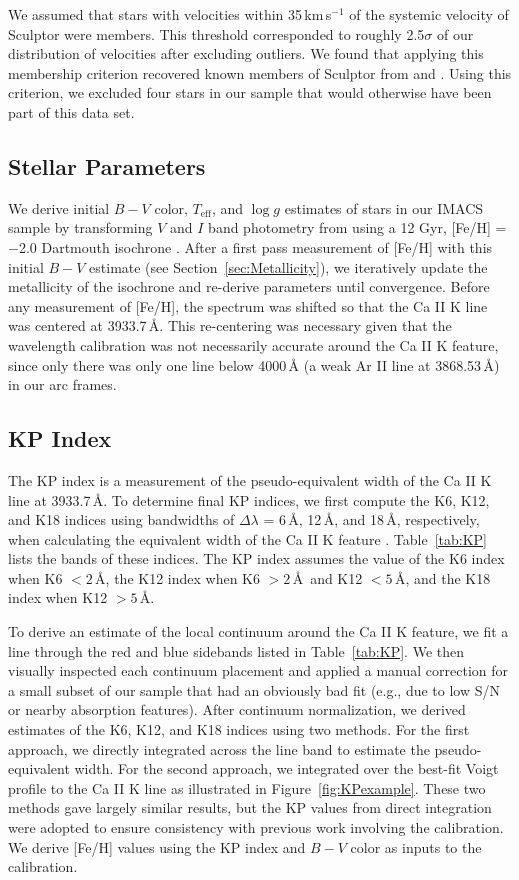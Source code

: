 \documentclass{emulateapj-rtx4}
\begin{document}
We assumed that stars with velocities within 35\,km\,s$^{-1}$ of the systemic velocity of Sculptor were members.
This threshold corresponded to roughly 2.5$\sigma$ of our distribution of velocities after excluding outliers.
We found that applying this membership criterion recovered known members of Sculptor from \citet{wmo+09} and \citet{kgb+09}.
Using this criterion, we excluded four stars in our sample that would otherwise have been part of this data set.

\subsection{Stellar Parameters}
\label{sec:atm}
We derive initial $B-V$ color, $T_{\text{eff}}$, and $\log g$ estimates of stars in our IMACS sample by 
transforming $V$ and $I$ band photometry from \citet{cdb+05} using a 12 Gyr, [Fe/H] = $-$2.0 
Dartmouth isochrone \citep{dcj+08}. 
After a first pass measurement of [Fe/H] with this initial $B-V$ 
estimate (see Section~\ref{sec:Metallicity}), we iteratively update the metallicity 
of the isochrone and re-derive parameters until convergence. 
Before any measurement of [Fe/H], the spectrum was shifted so that the Ca II K line was centered at 3933.7\,\AA.
This re-centering was necessary given that the wavelength calibration was not necessarily accurate around the Ca II K feature, since only there was only one line below 4000\,\AA\,\,(a weak Ar II line at 3868.53\,\AA) in our arc frames.


\subsection{KP Index}
\label{sec:KP}
The KP index is a measurement of the pseudo-equivalent width of the Ca II K line at 3933.7\,\AA. 
To determine final KP indices, we first compute the K6, K12, and K18 indices
using bandwidths of $\Delta\lambda$ = 6\,\AA, 12\,\AA, and 18\,\AA, respectively, 
when calculating the equivalent width of the Ca II K feature \citep{bkg+90}. 
Table~\ref{tab:KP} lists the bands of these indices.
The KP index assumes the value of the K6 index when K6 $< 2$\,\AA,
the K12 index when K6 $> 2$\,\AA\, and K12 $< 5$\,\AA, and the K18 index 
when K12 $>5$\,\AA. 

To derive an estimate of the local continuum around the Ca II K feature, we 
fit a line through the red and blue sidebands listed in Table~\ref{tab:KP}.
We then visually inspected each continuum placement and 
applied a manual correction for a small subset of our sample that had 
an obviously bad fit (e.g., due to low S/N or nearby absorption features).
After continuum normalization, we derived estimates of the K6, K12, and K18 indices
using two methods. For the first approach,  we directly integrated across the line band to estimate the 
pseudo-equivalent width. For the second approach, we integrated over the best-fit Voigt profile to the Ca II K line as 
illustrated in Figure~\ref{fig:KPexample}. These two methods gave largely similar results, but the 
KP values from direct integration were adopted to ensure consistency with previous work involving the calibration. 
We derive [Fe/H] values using the KP index and $B-V$ color as inputs to the \citet{brn+99} calibration.
\end{document}
